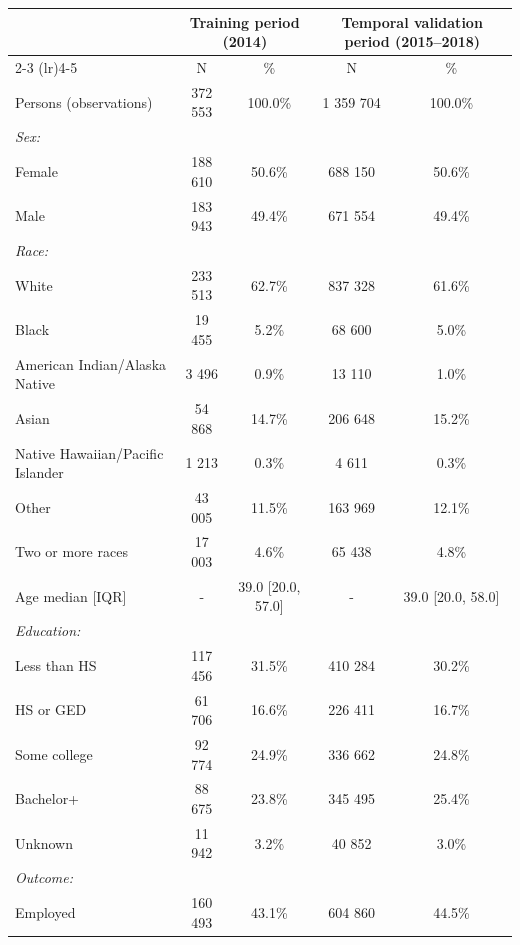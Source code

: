 \begin{tabular}{lcccc}
\toprule
 & \multicolumn{2}{c}{Training period (2014)} & \multicolumn{2}{c}{Temporal validation period (2015--2018)} \\
\cmidrule(lr){2-3} \cmidrule(lr){4-5}
 & N & \% & N & \% \\
\midrule
Persons (observations) & 372 553 & 100.0\% & 1 359 704 & 100.0\% \\
\addlinespace
\textit{Sex:} &  &  &  &  \\
Female & 188 610 & 50.6\% & 688 150 & 50.6\% \\
Male & 183 943 & 49.4\% & 671 554 & 49.4\% \\
\addlinespace
\textit{Race:} &  &  &  &  \\
White & 233 513 & 62.7\% & 837 328 & 61.6\% \\
Black & 19 455 & 5.2\% & 68 600 & 5.0\% \\
American Indian/Alaska Native & 3 496 & 0.9\% & 13 110 & 1.0\% \\
Asian & 54 868 & 14.7\% & 206 648 & 15.2\% \\
Native Hawaiian/Pacific Islander & 1 213 & 0.3\% & 4 611 & 0.3\% \\
Other & 43 005 & 11.5\% & 163 969 & 12.1\% \\
Two or more races & 17 003 & 4.6\% & 65 438 & 4.8\% \\
Age median [IQR] & - & 39.0 [20.0, 57.0] & - & 39.0 [20.0, 58.0] \\
\addlinespace
\textit{Education:} &  &  &  &  \\
Less than HS & 117 456 & 31.5\% & 410 284 & 30.2\% \\
HS or GED & 61 706 & 16.6\% & 226 411 & 16.7\% \\
Some college & 92 774 & 24.9\% & 336 662 & 24.8\% \\
Bachelor+ & 88 675 & 23.8\% & 345 495 & 25.4\% \\
Unknown & 11 942 & 3.2\% & 40 852 & 3.0\% \\
\addlinespace
\textit{Outcome:} &  &  &  &  \\
Employed & 160 493 & 43.1\% & 604 860 & 44.5\% \\
\bottomrule
\end{tabular}
